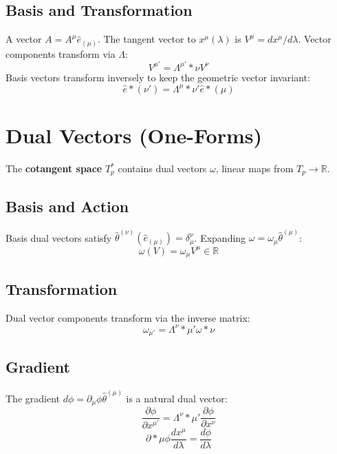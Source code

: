 \documentclass[11pt, a4paper]{report}
\begin{document}
\subsection*{Basis and Transformation}
A vector $A = A^\mu \hat{e}_{(\mu)}$. The tangent vector to $x^\mu(\lambda)$ is $V^\mu = dx^\mu/d\lambda$.
Vector components transform via $\Lambda$:
\begin{equation}
V^{\mu'} = {\Lambda^{\mu'}}*\nu V^\nu
\end{equation}
Basis vectors transform inversely to keep the geometric vector invariant:
\begin{equation}
\hat{e}*{(\nu')} = {\Lambda^\mu}*{\nu'} \hat{e}*{(\mu)}
\end{equation}

\section{Dual Vectors (One-Forms)}
The \textbf{cotangent space} $T_p^*$ contains dual vectors $\omega$, linear maps from $T_p \to \mathbb{R}$.

\subsection*{Basis and Action}
Basis dual vectors satisfy $\hat{\theta}^{(\nu)}(\hat{e}_{(\mu)}) = \delta^\nu_\mu$. Expanding $\omega = \omega_\mu \hat{\theta}^{(\mu)}$:
\begin{equation}
\omega(V) = \omega_\mu V^\mu \in \mathbb{R}
\end{equation}

\subsection*{Transformation}
Dual vector components transform via the inverse matrix:
\begin{equation}
\omega_{\mu'} = {\Lambda^\nu}*{\mu'} \omega*\nu
\end{equation}

\subsection*{Gradient}
The gradient $d\phi = \partial_\mu \phi \hat{\theta}^{(\mu)}$ is a natural dual vector:
\begin{equation}
\frac{\partial\phi}{\partial x^{\mu'}} = {\Lambda^\nu}*{\mu'} \frac{\partial\phi}{\partial x^\nu}
\end{equation}
\begin{equation}
\partial*\mu\phi \frac{dx^\mu}{d\lambda} = \frac{d\phi}{d\lambda}
\end{equation}
\end{document}
